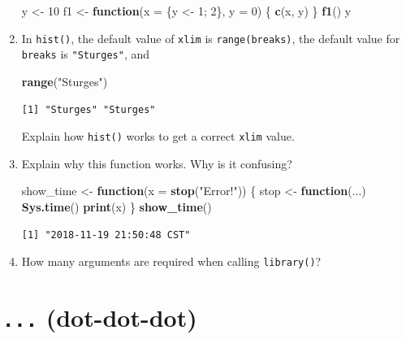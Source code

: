 \documentclass[]{book}
\newenvironment{Shaded}{\begin{snugshade}}{\end{snugshade}}
\newcommand{\ControlFlowTok}[1]{\textcolor[rgb]{0.13,0.29,0.53}{\textbf{#1}}}
\newcommand{\DataTypeTok}[1]{\textcolor[rgb]{0.13,0.29,0.53}{#1}}
\newcommand{\DecValTok}[1]{\textcolor[rgb]{0.00,0.00,0.81}{#1}}
\newcommand{\KeywordTok}[1]{\textcolor[rgb]{0.13,0.29,0.53}{\textbf{#1}}}
\newcommand{\NormalTok}[1]{#1}
\newcommand{\StringTok}[1]{\textcolor[rgb]{0.31,0.60,0.02}{#1}}
\theoremstyle{definition}
\theoremstyle{definition}
\theoremstyle{definition}
\theoremstyle{remark}
\begin{document}
\begin{enumerate}
\begin{Shaded}
\begin{Highlighting}[]
\NormalTok{y <-}\StringTok{ }\DecValTok{10}
\NormalTok{f1 <-}\StringTok{ }\ControlFlowTok{function}\NormalTok{(}\DataTypeTok{x =}\NormalTok{ \{y <-}\StringTok{ }\DecValTok{1}\NormalTok{; }\DecValTok{2}\NormalTok{\}, }\DataTypeTok{y =} \DecValTok{0}\NormalTok{) \{}
  \KeywordTok{c}\NormalTok{(x, y)}
\NormalTok{\}}
\KeywordTok{f1}\NormalTok{()}
\NormalTok{y}
\end{Highlighting}
\end{Shaded}
\item
  In \texttt{hist()}, the default value of \texttt{xlim} is
  \texttt{range(breaks)}, the default value for \texttt{breaks} is
  \texttt{"Sturges"}, and

\begin{Shaded}
\begin{Highlighting}[]
\KeywordTok{range}\NormalTok{(}\StringTok{"Sturges"}\NormalTok{)}
\end{Highlighting}
\end{Shaded}

\begin{verbatim}
[1] "Sturges" "Sturges"
\end{verbatim}

  Explain how \texttt{hist()} works to get a correct \texttt{xlim}
  value.
\item
  Explain why this function works. Why is it confusing?

\begin{Shaded}
\begin{Highlighting}[]
\NormalTok{show_time <-}\StringTok{ }\ControlFlowTok{function}\NormalTok{(}\DataTypeTok{x =} \KeywordTok{stop}\NormalTok{(}\StringTok{"Error!"}\NormalTok{)) \{}
\NormalTok{  stop <-}\StringTok{ }\ControlFlowTok{function}\NormalTok{(...) }\KeywordTok{Sys.time}\NormalTok{()}
  \KeywordTok{print}\NormalTok{(x)}
\NormalTok{\}}
\KeywordTok{show_time}\NormalTok{()}
\end{Highlighting}
\end{Shaded}

\begin{verbatim}
[1] "2018-11-19 21:50:48 CST"
\end{verbatim}
\item
  How many arguments are required when calling \texttt{library()}?
\end{enumerate}

\hypertarget{fun-dot-dot-dot}{%
\section{\texorpdfstring{\texttt{...}
(dot-dot-dot)}{... (dot-dot-dot)}}\label{fun-dot-dot-dot}}
\end{document}
